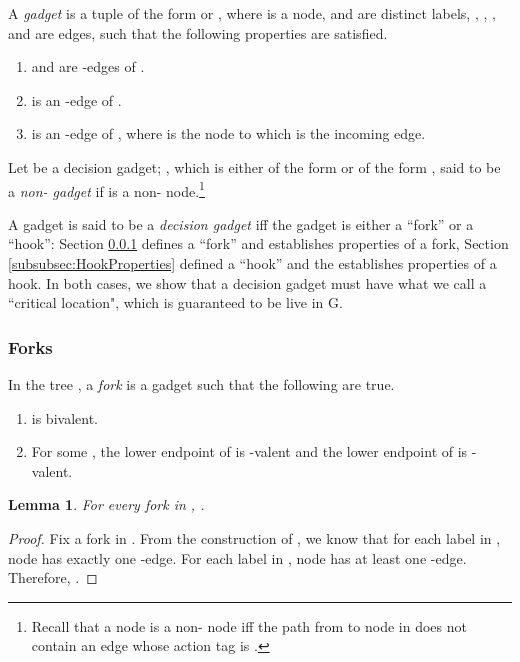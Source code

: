 \documentclass[11pt]{article}
\numberwithin{theorem}{section}
\newtheorem{lemma}[theorem]{Lemma}
\begin{document}
A \emph{gadget} is a tuple of the form  or , where  is a node,  and  are distinct labels, , , , and  are edges, such that the following properties are satisfied.
\begin{enumerate}
\item  and  are -edges of .
 \item  is an -edge of .
 \item  is an -edge of , where  is the node to which  is the incoming edge.
\end{enumerate}

Let  be a decision gadget; , which is either of the form  or of the form , said to be a \emph{non- gadget} if  is a non- node.\footnote{Recall that a node  is a non- node iff the path from  to node  in  does not contain an edge whose action tag is .}

 A gadget is said to be a \emph{decision gadget} iff the gadget is either a ``fork'' or a ``hook'': Section \ref{subsubsec:ForkProperties} defines a ``fork'' and establishes properties of a fork, Section \ref{subsubsec:HookProperties} defined a ``hook'' and the establishes properties of a hook.   In both cases, we show that a decision gadget must have what we call a ``critical location", which is guaranteed to be live in G.










\subsubsection{Forks}
\label{subsubsec:ForkProperties}

In the tree , a \emph{fork} is a gadget  such that the following are true.
\begin{enumerate}
 \item  is bivalent.
 \item For some , the lower endpoint  of  is -valent and the lower endpoint  of  is -valent.
\end{enumerate}
 
 \begin{lemma}\label{lem:forkTaskFD}
For every fork  in , .
\end{lemma}
\begin{proof}
Fix a fork  in . 
From the construction of , we know that for each label  in , node  has exactly one -edge. For each label  in , node  has at least one -edge. Therefore, .
\end{proof}
\end{document}

